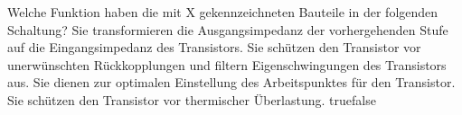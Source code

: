     {Welche Funktion haben die mit X gekennzeichneten Bauteile in der folgenden Schaltung?}
    {Sie transformieren die Ausgangsimpedanz der vorhergehenden Stufe auf die Eingangsimpedanz des Transistors. }
    {Sie schützen den Transistor vor unerwünschten Rückkopplungen und filtern Eigenschwingungen des Transistors aus. }
    {Sie dienen zur optimalen Einstellung des Arbeitspunktes für den Transistor.}
    {Sie schützen den Transistor vor thermischer Überlastung.}
    {true}{false}